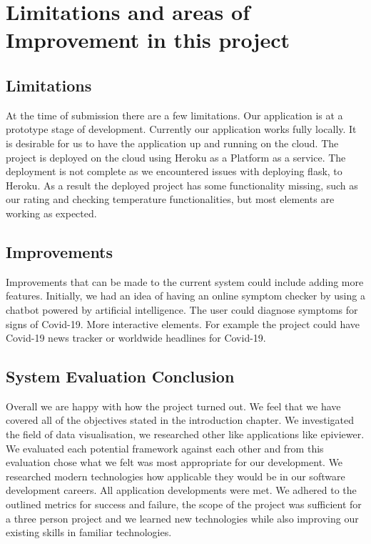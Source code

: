 \section{Limitations and areas of Improvement in this project}

\subsection{Limitations}
At the time of submission there are a few limitations. Our application is at a prototype stage of development. Currently our application works fully locally. It is desirable for us to have the application up and running on the cloud.  The project is deployed on the cloud using Heroku as a Platform as a service. The deployment is not complete as we encountered issues with deploying flask, to Heroku. As a result the deployed project has some functionality missing, such as our rating and checking temperature functionalities, but most elements are working as expected. 




\subsection{Improvements}
Improvements that can be made to the current system could include adding more features. Initially, we had an idea of having an online symptom checker by using a chatbot powered by artificial intelligence. The user could diagnose symptoms for signs of Covid-19.
More interactive elements. For example the project could have Covid-19 news tracker or worldwide headlines for Covid-19. 

\subsection{System Evaluation Conclusion}
Overall we are happy with how the project turned out. We feel that we have covered all of the objectives stated in the introduction chapter. We investigated the field of data visualisation, we researched other like applications like epiviewer.\cite{thorve2018epiviewer}\\
We evaluated each potential framework against each other and from this evaluation chose what we felt was most appropriate for our development.
We researched modern technologies how applicable they would be in our software development careers. All application developments were met. We adhered to the outlined metrics for success and failure, the scope of the project was sufficient for a three person project and we learned new technologies while also improving our existing skills in familiar technologies.


